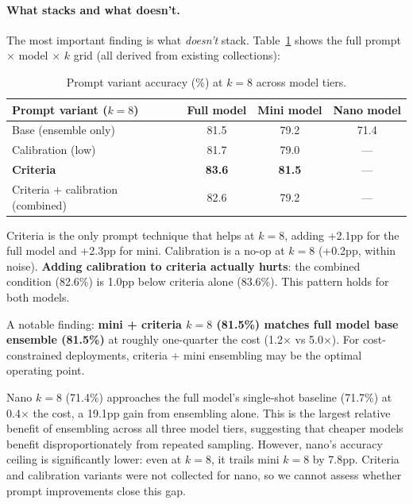 \documentclass{article}
\begin{document}
\paragraph{What stacks and what doesn't.}
\label{sec:what-works}
The most important finding is what \emph{doesn't} stack. Table~\ref{tab:what-works} shows the full prompt $\times$ model $\times$ $k$ grid (all derived from existing collections):

\begin{table}[ht]
\centering
\caption{Prompt variant accuracy (\%) at $k{=}8$ across model tiers.}
\label{tab:what-works}
\begin{tabular}{lccc}
\toprule
Prompt variant ($k{=}8$) & Full model & Mini model & Nano model \\
\midrule
Base (ensemble only)            & 81.5 & 79.2 & 71.4 \\
Calibration (low)               & 81.7 & 79.0 & --- \\
\textbf{Criteria}               & \textbf{83.6} & \textbf{81.5} & --- \\
Criteria + calibration (combined) & 82.6 & 79.2 & --- \\
\bottomrule
\end{tabular}
\end{table}

Criteria is the only prompt technique that helps at $k{=}8$, adding +2.1pp for the full model and +2.3pp for mini. Calibration is a no-op at $k{=}8$ (+0.2pp, within noise). \textbf{Adding calibration to criteria actually hurts}: the combined condition (82.6\%) is 1.0pp below criteria alone (83.6\%). This pattern holds for both models.

A notable finding: \textbf{mini + criteria $k{=}8$ (81.5\%) matches full model base ensemble (81.5\%)} at roughly one-quarter the cost (1.2$\times$ vs 5.0$\times$). For cost-constrained deployments, criteria + mini ensembling may be the optimal operating point.

Nano $k{=}8$ (71.4\%) approaches the full model's single-shot baseline (71.7\%) at 0.4$\times$ the cost, a 19.1pp gain from ensembling alone. This is the largest relative benefit of ensembling across all three model tiers, suggesting that cheaper models benefit disproportionately from repeated sampling. However, nano's accuracy ceiling is significantly lower: even at $k{=}8$, it trails mini $k{=}8$ by 7.8pp. Criteria and calibration variants were not collected for nano, so we cannot assess whether prompt improvements close this gap.
\end{document}
